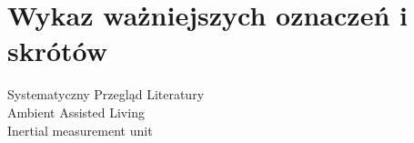 \chapter*{Wykaz ważniejszych oznaczeń i skrótów}

\begin{description}
	\item [Systematyczny Przegląd Literatury] 
	\item [Ambient Assisted Living]
	\item [Inertial measurement unit]
\end{description}
